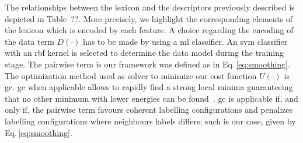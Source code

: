 The relationships between the lexicon and the descriptors previously described is depicted in Table~{\color{red}??}. More precisely, we highlight the corresponding elements of the lexicon which is encoded by each feature. A choice regarding the encoding of the data term $D(\cdot)$ has to be made by using a \ac{ml} classifier. An \ac{svm} classifier with an \ac{rbf} kernel is selected to determine the data model during the training stage. The pairwise term is our framework was defined as in Eq.\,\eqref{eq:smoothing}. The optimization method used as solver to minimize our cost function $U(\cdot)$ is \ac{gc}. \ac{gc} when applicable allows to rapidly find a strong local minima guaranteeing that no other minimum with lower energies can be found~\cite{delong2012fast}. \ac{gc} is applicable if, and only if, the pairwise term favours coherent labelling configurations and penalizes labelling configurations where neighbours labels differs; such is our case, given by Eq.\,\eqref{eq:smoothing}.

